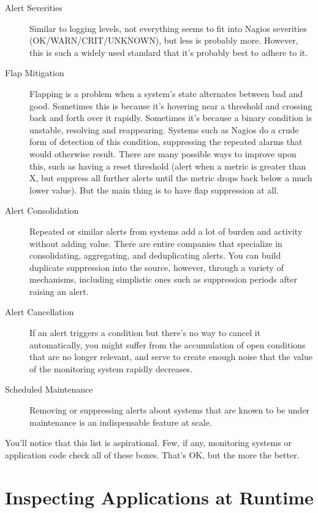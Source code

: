 \documentclass{vivid_layout}
\begin{document}
\begin{description}

\item[Alert Severities] Similar to logging levels, not everything seems to fit
into Nagios severities (OK/WARN/CRIT/UNKNOWN), but less is probably more.
However, this is such a widely used standard that it's probably best to adhere
to it.

\item[Flap Mitigation] Flapping is a problem when a system's state alternates
between bad and good. Sometimes this is because it's hovering near a threshold
and crossing back and forth over it rapidly. Sometimes it's because a binary
condition is unstable, resolving and reappearing. Systems such as Nagios do a
crude form of detection of this condition, suppressing the repeated alarms that
would otherwise result. There are many possible ways to improve upon this, such
as having a reset threshold (alert when a metric is greater than X, but suppress
all further alerts until the metric drops back below a much lower value). But
the main thing is to have flap suppression at all.

\item[Alert Consolidation] Repeated or similar alerts from systems add a lot of burden
and activity without adding value. There are entire companies that specialize in
consolidating, aggregating, and deduplicating alerts. You can build duplicate
suppression into the source, however, through a variety
of mechanisms, including simplistic ones such as suppression periods after raising an
alert.

\item[Alert Cancellation] If an alert triggers a condition but there's no way to
cancel it automatically, you might suffer from the accumulation of
open conditions that are no longer relevant, and serve to create enough noise
that the value of the monitoring system rapidly decreases.

\item[Scheduled Maintenance] Removing or suppressing alerts about systems that
are known to be under maintenance is an indispensable feature at scale.

\end{description}

You'll notice that this list is aspirational. Few, if any, monitoring systems
or application code check all of these boxes. That's OK, but the more the
better.

\section{Inspecting Applications at Runtime}
\end{document}
